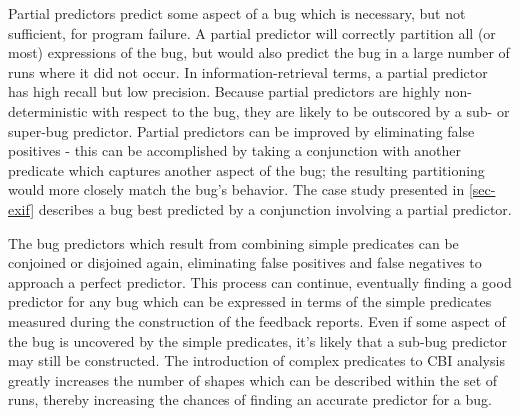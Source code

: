 Partial predictors predict some aspect of a bug which is necessary, but not sufficient, for program failure.  A partial predictor will correctly partition all (or most) expressions of the bug, but would also predict the bug in a large number of runs where it did not occur.  In information-retrieval terms, a partial predictor has high recall but low precision.  Because partial predictors are highly non-deterministic with respect to the bug, they are likely to be outscored by a sub- or super-bug predictor.  Partial predictors can be improved by eliminating false positives - this can be accomplished by taking a conjunction with another predicate which captures another aspect of the bug; the resulting partitioning would more closely match the bug's behavior.  The case study presented in \autoref{sec-exif} describes a bug best predicted by a conjunction involving a partial predictor.

The bug predictors which result from combining simple predicates can be conjoined or disjoined again, eliminating false positives and false negatives to approach a perfect predictor.  This process can continue, eventually finding a good predictor for any bug which can be expressed in terms of the simple predicates measured during the construction of the feedback reports.  Even if some aspect of the bug is uncovered by the simple predicates, it's likely that a sub-bug predictor may still be constructed.  The introduction of complex predicates to CBI analysis greatly increases the number of shapes which can be described within the set of runs, thereby increasing the chances of finding an accurate predictor for a bug.
